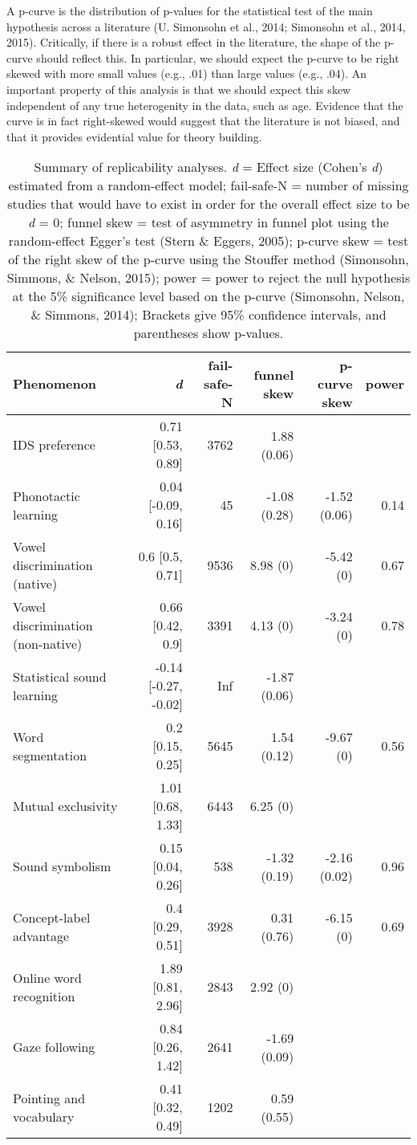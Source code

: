 \documentclass[english,floatsintext,man]{apa6}
\begin{document}
A p-curve is the distribution of p-values for the statistical test of
the main hypothesis across a literature (U. Simonsohn et al., 2014;
Simonsohn et al., 2014, 2015). Critically, if there is a robust effect
in the literature, the shape of the p-curve should reflect this. In
particular, we should expect the p-curve to be right skewed with more
small values (e.g., .01) than large values (e.g., .04). An important
property of this analysis is that we should expect this skew independent
of any true heterogenity in the data, such as age. Evidence that the
curve is in fact right-skewed would suggest that the literature is not
biased, and that it provides evidential value for theory building.

\begin{table}[t]
\footnotesize
\begin{tabular}{lrrrrr}
\toprule
\textbf{Phenomenon}& \textbf{\textit{d}} & \textbf{fail-safe-N} & \textbf{funnel skew} & \textbf{p-curve skew} & \textbf{power}\\
\midrule
IDS preference & 0.71 [0.53, 0.89] & 3762 & 1.88 (0.06) &  & \\
Phonotactic learning & 0.04 [-0.09, 0.16] & 45 & -1.08 (0.28) & -1.52 (0.06) & 0.14\\
Vowel discrimination (native) & 0.6 [0.5, 0.71] & 9536 & 8.98 (0) & -5.42 (0) & 0.67\\
Vowel discrimination (non-native) & 0.66 [0.42, 0.9] & 3391 & 4.13 (0) & -3.24 (0) & 0.78\\
Statistical sound learning & -0.14 [-0.27, -0.02] & Inf & -1.87 (0.06) &  & \\
Word segmentation & 0.2 [0.15, 0.25] & 5645 & 1.54 (0.12) & -9.67 (0) & 0.56\\
Mutual exclusivity & 1.01 [0.68, 1.33] & 6443 & 6.25 (0) &  & \\
Sound symbolism & 0.15 [0.04, 0.26] & 538 & -1.32 (0.19) & -2.16 (0.02) & 0.96\\
Concept-label advantage & 0.4 [0.29, 0.51] & 3928 & 0.31 (0.76) & -6.15 (0) & 0.69\\
Online word recognition & 1.89 [0.81, 2.96] & 2843 & 2.92 (0) &  & \\
Gaze following & 0.84 [0.26, 1.42] & 2641 & -1.69 (0.09) &  & \\
Pointing and vocabulary & 0.41 [0.32, 0.49] & 1202 & 0.59 (0.55) &  & \\
\bottomrule
\end{tabular}
\caption{Summary of replicability analyses. \textit{d} = Effect size (Cohen's {\it d}) estimated from a random-effect model; fail-safe-N = number of missing studies that would have to exist in order for the overall effect size to be {\it d} = 0; funnel skew = test of asymmetry in funnel plot using the random-effect Egger's test (Stern \& Eggers, 2005); p-curve skew = test of the right skew of the p-curve using the Stouffer method (Simonsohn, Simmons, \& Nelson, 2015); power = power to reject the null hypothesis at the 5\% significance level based on the p-curve (Simonsohn, Nelson, \& Simmons, 2014);  Brackets give 95\% confidence intervals, and parentheses show p-values.}
\end{table}
\end{document}
